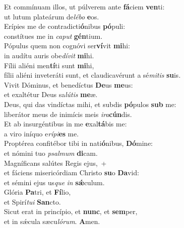 \evenverse Et commínuam illos, ut púlverem ante \textbf{fá}ciem \textbf{ven}ti:~\*\\
\evenverse ut lutum plateárum de\textit{lé}\textit{bo} \textbf{e}os.\\
\oddverse Erípies me de contradicti\textbf{ó}nibus \textbf{pó}puli:~\*\\
\oddverse constítues me in \textit{ca}\textit{put} \textbf{gén}tium.\\
\evenverse Pópulus quem non cognóvi ser\textbf{ví}vit \textbf{mi}hi:~\*\\
\evenverse in audítu auris obe\textit{dí}\textit{vit} \textbf{mi}hi.\\
\oddverse Fílii aliéni men\textbf{tí}ti sunt \textbf{mi}hi,~\*\\
\oddverse fílii aliéni inveteráti sunt, et claudicavérunt a sé\textit{mi}\textit{tis} \textbf{su}is.\\
\evenverse Vivit Dóminus, et benedíctus \textbf{De}us \textbf{me}us:~\*\\
\evenverse et exaltétur Deus sa\textit{lú}\textit{tis} \textbf{me}æ.\\
\oddverse Deus, qui das vindíctas mihi, et subdis \textbf{pó}pulos \textbf{sub} me:~\*\\
\oddverse liberátor meus de inimícis meis \textit{i}\textit{ra}\textbf{cún}dis.\\
\evenverse Et ab insurgéntibus in me \textbf{e}xal\textbf{tá}bis me:~\*\\
\evenverse a viro iníquo e\textit{rí}\textit{pi}\textbf{es} me.\\
\oddverse Proptérea confitébor tibi in nati\textbf{ó}nibus, \textbf{Dó}mine:~\*\\
\oddverse et nómini tuo \textit{psal}\textit{mum} \textbf{di}cam.\\
\evenverse Magníficans salútes Regis ejus,~+\\
\evenverse  et fáciens misericórdiam Christo \textbf{su}o \textbf{Da}vid:~\*\\
\evenverse et sémini ejus us\textit{que} \textit{in} \textbf{sǽ}culum.\\
\oddverse Glória \textbf{Pa}tri, et \textbf{Fí}lio,~\*\\
\oddverse et Spirí\textit{tu}\textit{i} \textbf{San}cto.\\
\evenverse Sicut erat in princípio, et \textbf{nunc}, et \textbf{sem}per,~\*\\
\evenverse et in sǽcula sæcu\textit{ló}\textit{rum}. \textbf{A}men.\\
